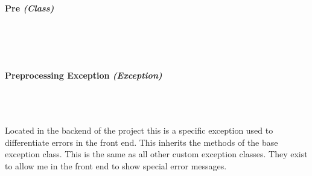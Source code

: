 \begin{FlushLeft}
    \bk

    \pagebreak
\paragraph{Pre \textit{(Class)}} \mbox{} \\

    \begin{figure}[H]
        \centering
    \end{figure}\\

    \bk

    \pagebreak
\paragraph{Preprocessing Exception \textit{(Exception)}} \mbox{} \\

    \begin{figure}[H]
        \centering
    \end{figure}\\
    Located in the backend of the project this is a specific exception used to differentiate errors in the front end. This inherits the methods of the base exception class. This is the same as all other custom exception classes. They exist to allow me in the front end to show special error messages.
    \bk


\end{FlushLeft}
